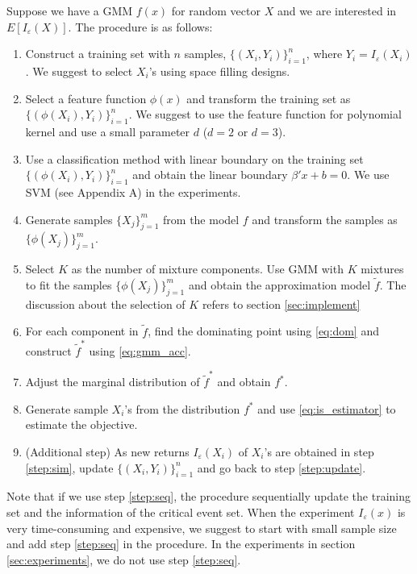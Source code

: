 \documentclass[letterpaper, 10 pt, journal]{IEEEtran}  %
\begin{document}
Suppose we have a GMM $f(x)$ for random vector $X$ and we are interested in $E[I_\varepsilon(X)]$. The procedure is as follows:
\begin{enumerate}
	\item Construct a training set with $n$ samples, $\{(X_i,Y_i)\}_{i=1}^{n}$, where $Y_i=I_\varepsilon(X_i)$. We suggest to select $X_i$'s using space filling designs. \label{step:update}
    
	\item Select a feature function $\phi(x)$ and transform the training set as $\{(\phi(X_i),Y_i)\}_{i=1}^{n}$. We suggest to use the feature function for polynomial kernel and use a small parameter $d$ ($d=2$ or $d=3$).
    
    \item Use a classification method with linear boundary on the training set $\{(\phi(X_i),Y_i)\}_{i=1}^{n}$ and obtain the linear boundary $\beta'x+b=0$. We use SVM (see Appendix A) in the experiments.
    
	\item Generate samples $\{X_j\}_{j=1}^{m}$ from the model $f$ and transform the samples as $\{\phi(X_j)\}_{j=1}^{m}$.
    
	\item Select $K$ as the number of mixture components. Use GMM with $K$ mixtures to fit the samples $\{\phi(X_j)\}_{j=1}^{m}$ and obtain the approximation model $\tilde{f}$. The discussion about the selection of $K$ refers to section \ref{sec:implement}
    
    \item For each component in $\tilde{f}$, find the dominating point using \eqref{eq:dom} and construct $\tilde{f}^*$ using \eqref{eq:gmm_acc}.
    
    \item Adjust the marginal distribution of $\tilde{f}^*$ and obtain $f^*$.
    
    \item Generate sample $X_i$'s from the distribution $f^*$ and use \eqref{eq:is_estimator} to estimate the objective. \label{step:sim}
    
    \item (Additional step) As new returns $I_\varepsilon(X_i)$ of $X_i$'s are obtained in step \ref{step:sim}, update $\{(X_i,Y_i)\}_{i=1}^{n}$ and go back to step \ref{step:update}.\label{step:seq}
\end{enumerate}

Note that if we use step \ref{step:seq}, the procedure sequentially update the training set and the information of the critical event set. When the experiment $I_\varepsilon(x)$ is very time-consuming and expensive, we suggest to start with small sample size and add step \ref{step:seq} in the procedure. In the experiments in section \ref{sec:experiments}, we do not use step \ref{step:seq}.
\end{document}
